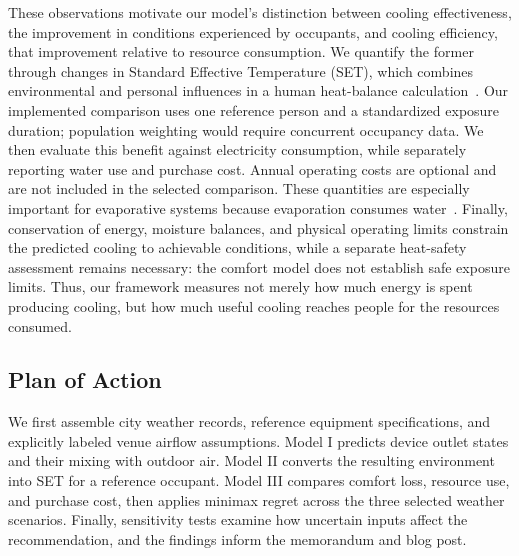 These observations motivate our model's distinction between cooling effectiveness, the improvement in conditions experienced by occupants, and cooling efficiency, that improvement relative to resource consumption. We quantify the former through changes in Standard Effective Temperature (SET), which combines environmental and personal influences in a human heat-balance calculation~\cite{ashrae_thermal_comfort_2025}. Our implemented comparison uses one reference person and a standardized exposure duration; population weighting would require concurrent occupancy data. We then evaluate this benefit against electricity consumption, while separately reporting water use and purchase cost. Annual operating costs are optional and are not included in the selected comparison. These quantities are especially important for evaporative systems because evaporation consumes water~\cite{pnnl_evaporative}. Finally, conservation of energy, moisture balances, and physical operating limits constrain the predicted cooling to achievable conditions, while a separate heat-safety assessment remains necessary: the comfort model does not establish safe exposure limits. Thus, our framework measures not merely how much energy is spent producing cooling, but how much useful cooling reaches people for the resources consumed.


\subsection{Plan of Action}
We first assemble city weather records, reference equipment specifications, and explicitly labeled venue airflow assumptions. Model I predicts device outlet states and their mixing with outdoor air. Model II converts the resulting environment into SET for a reference occupant. Model III compares comfort loss, resource use, and purchase cost, then applies minimax regret across the three selected weather scenarios. Finally, sensitivity tests examine how uncertain inputs affect the recommendation, and the findings inform the memorandum and blog post.
